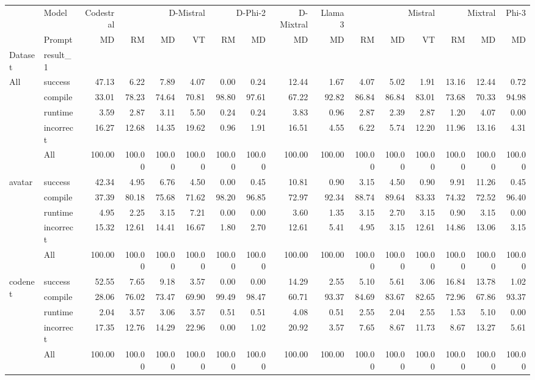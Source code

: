 \begin{tabular}{llrrrrrrrrrrrrrr}
\toprule
 & Model & Codestral & \multicolumn{3}{r}{D-Mistral} & \multicolumn{2}{r}{D-Phi-2} & D-Mixtral & Llama 3 & \multicolumn{3}{r}{Mistral} & \multicolumn{2}{r}{Mixtral} & Phi-3 \\
 & Prompt & MD & RM & MD & VT & RM & MD & MD & MD & RM & MD & VT & RM & MD & MD \\
Dataset & result_1 &  &  &  &  &  &  &  &  &  &  &  &  &  &  \\
\midrule
\multirow[t]{5}{*}{All} & success & 47.13 & 6.22 & 7.89 & 4.07 & 0.00 & 0.24 & 12.44 & 1.67 & 4.07 & 5.02 & 1.91 & 13.16 & 12.44 & 0.72 \\
 & compile & 33.01 & 78.23 & 74.64 & 70.81 & 98.80 & 97.61 & 67.22 & 92.82 & 86.84 & 86.84 & 83.01 & 73.68 & 70.33 & 94.98 \\
 & runtime & 3.59 & 2.87 & 3.11 & 5.50 & 0.24 & 0.24 & 3.83 & 0.96 & 2.87 & 2.39 & 2.87 & 1.20 & 4.07 & 0.00 \\
 & incorrect & 16.27 & 12.68 & 14.35 & 19.62 & 0.96 & 1.91 & 16.51 & 4.55 & 6.22 & 5.74 & 12.20 & 11.96 & 13.16 & 4.31 \\
 & All & 100.00 & 100.00 & 100.00 & 100.00 & 100.00 & 100.00 & 100.00 & 100.00 & 100.00 & 100.00 & 100.00 & 100.00 & 100.00 & 100.00 \\
\cline{1-16}
\multirow[t]{5}{*}{avatar} & success & 42.34 & 4.95 & 6.76 & 4.50 & 0.00 & 0.45 & 10.81 & 0.90 & 3.15 & 4.50 & 0.90 & 9.91 & 11.26 & 0.45 \\
 & compile & 37.39 & 80.18 & 75.68 & 71.62 & 98.20 & 96.85 & 72.97 & 92.34 & 88.74 & 89.64 & 83.33 & 74.32 & 72.52 & 96.40 \\
 & runtime & 4.95 & 2.25 & 3.15 & 7.21 & 0.00 & 0.00 & 3.60 & 1.35 & 3.15 & 2.70 & 3.15 & 0.90 & 3.15 & 0.00 \\
 & incorrect & 15.32 & 12.61 & 14.41 & 16.67 & 1.80 & 2.70 & 12.61 & 5.41 & 4.95 & 3.15 & 12.61 & 14.86 & 13.06 & 3.15 \\
 & All & 100.00 & 100.00 & 100.00 & 100.00 & 100.00 & 100.00 & 100.00 & 100.00 & 100.00 & 100.00 & 100.00 & 100.00 & 100.00 & 100.00 \\
\cline{1-16}
\multirow[t]{5}{*}{codenet} & success & 52.55 & 7.65 & 9.18 & 3.57 & 0.00 & 0.00 & 14.29 & 2.55 & 5.10 & 5.61 & 3.06 & 16.84 & 13.78 & 1.02 \\
 & compile & 28.06 & 76.02 & 73.47 & 69.90 & 99.49 & 98.47 & 60.71 & 93.37 & 84.69 & 83.67 & 82.65 & 72.96 & 67.86 & 93.37 \\
 & runtime & 2.04 & 3.57 & 3.06 & 3.57 & 0.51 & 0.51 & 4.08 & 0.51 & 2.55 & 2.04 & 2.55 & 1.53 & 5.10 & 0.00 \\
 & incorrect & 17.35 & 12.76 & 14.29 & 22.96 & 0.00 & 1.02 & 20.92 & 3.57 & 7.65 & 8.67 & 11.73 & 8.67 & 13.27 & 5.61 \\
 & All & 100.00 & 100.00 & 100.00 & 100.00 & 100.00 & 100.00 & 100.00 & 100.00 & 100.00 & 100.00 & 100.00 & 100.00 & 100.00 & 100.00 \\
\cline{1-16}
\bottomrule
\end{tabular}
